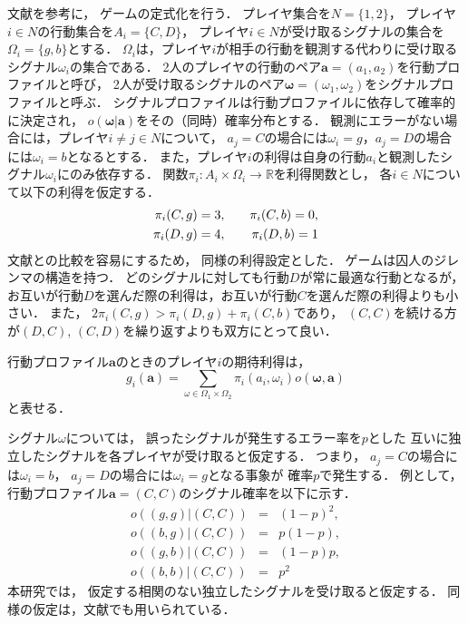 \documentclass[submit]{ipsj}
\theoremstyle{definition}
\begin{document}
文献\cite{koike-2022}を参考に，
ゲームの定式化を行う．
プレイヤ集合を$N = \{1, 2\}$，
プレイヤ$i \in N$の行動集合を$A_i = \{C, D\}$，
プレイヤ$i \in N$が受け取るシグナルの集合を$\Omega_i = \{g, b\}$とする．
$\Omega_i$は，プレイヤ$i$が相手の行動を観測する代わりに受け取るシグナル$\omega_i$の集合である．
2人のプレイヤの行動のペア$\bm{a} = (a_1, a_2)$を行動プロファイルと呼び，
2人が受け取るシグナルのペア$\bm{\omega} = (\omega_1, \omega_2)$をシグナルプロファイルと呼ぶ．
シグナルプロファイルは行動プロファイルに依存して確率的に決定され，
$o(\bm{\omega}|\bm{a})$をその（同時）確率分布とする．
観測にエラーがない場合には，プレイヤ$i \neq j \in N$について，
$a_j = C$の場合には$\omega_i = g$，$a_j = D$の場合には$\omega_i = b$となるとする．
また，プレイヤ$i$の利得は自身の行動$a_i$と観測したシグナル$\omega_i$にのみ依存する．
関数$\pi_i : A_i \times \Omega_i \rightarrow \mathbb{R}$を利得関数とし，
各$i \in N$について以下の利得を仮定する．
\begin{eqnarray}
  \pi_i(C, g) = 3, & \quad & \pi_i(C, b) = 0,\notag \\
  \pi_i(D, g) = 4, & \quad & \pi_i(D, b) = 1 \notag
\end{eqnarray}
文献\cite{koike-2022,Binmore-1992}との比較を容易にするため，
同様の利得設定とした．
ゲームは囚人のジレンマの構造を持つ．
どのシグナルに対しても行動$D$が常に最適な行動となるが，
お互いが行動$D$を選んだ際の利得は，お互いが行動$C$を選んだ際の利得よりも小さい．
また，
$2 \pi_i(C, g) > \pi_i(D, g) + \pi_i(C, b)$であり，
$(C, C)$を続ける方が$(D, C)$, $(C, D)$を繰り返すよりも双方にとって良い．

行動プロファイル$\bm{a}$のときのプレイヤ$i$の期待利得は，
\[ g_i(\bm{a}) = \sum_{\omega \in \Omega_1 \times \Omega_2} \pi_i(a_i, \omega_i) o(\bm{\omega}, \bm{a}) \]
と表せる．

シグナル$\omega$については，
誤ったシグナルが発生するエラー率を$p$とした
互いに独立したシグナルを各プレイヤが受け取ると仮定する．
つまり，
$a_j = C$の場合には$\omega_i = b$，
$a_j = D$の場合には$\omega_i = g$となる事象が
確率$p$で発生する．
例として，
行動プロファイル$\bm{a} = (C,C)$のシグナル確率を以下に示す．
\begin{eqnarray}
  o((g, g)|(C, C)) &=& (1 - p)^2, \nonumber \\
  o((b, g)|(C, C)) &=& p (1 - p), \nonumber \\
  o((g, b)|(C, C)) &=& (1 - p) p, \nonumber \\
  o((b, b)|(C, C)) &=& p^2 \nonumber
\end{eqnarray}
本研究では，
仮定する相関のない独立したシグナルを受け取ると仮定する．
同様の仮定は，文献\cite{koike-2022}でも用いられている．
\end{document}
